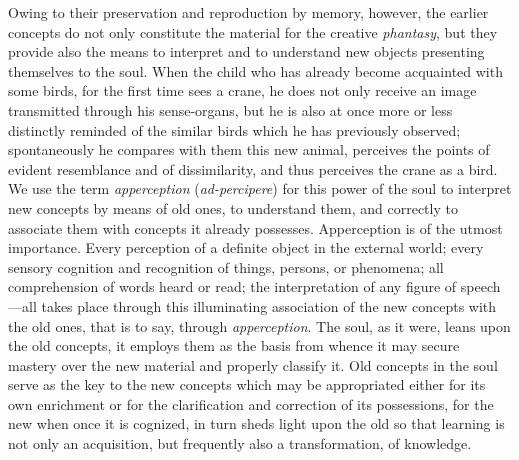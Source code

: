 Owing to their preservation and reproduction by memory, however, the earlier concepts do not only constitute the material for the creative \emph{phantasy}, but they provide also the means to interpret and to understand new objects presenting themselves to the soul. When the child who has already become acquainted with some birds, for the first time sees a crane, he does not only receive an image transmitted through his sense-organs, but he is also at once more or less distinctly reminded of the similar birds which he has previously observed; spontaneously he compares with them this new
animal, perceives the points of evident resemblance and of dissimilarity, and thus perceives the crane as a bird. We use the term \emph{apperception} (\emph{ad-percipere}) for this power of the soul to interpret new concepts by means of old ones, to understand them, and correctly to associate them with concepts it already possesses. Apperception is of the utmost importance. Every perception of a definite object in the external world; every sensory cognition and recognition of things, persons, or phenomena; all comprehension of words heard or read; the interpretation of any figure of speech—all takes place through this illuminating association of the new concepts with the old ones, that is to say, through \emph{apperception}. The soul, as it were, leans upon the old concepts, it employs them as the basis from whence it may secure mastery over the new material and properly classify it. Old concepts in the soul serve as the key to the new concepts which may be appropriated either for its own enrichment or for the clarification and correction of its possessions, for the new when once it is cognized, in turn sheds light upon the old so that learning is not only an acquisition, but frequently also a transformation, of knowledge.

